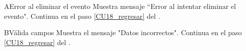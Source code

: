     \begin{UCtrayectoriaA}{A}{Error al eliminar el evento}
    	\UCpaso Muestra mensaje “Error al intentar eliminar el evento".
    	\UCpaso Continua en el paso \ref{CU18_regresar} del .
    \end{UCtrayectoriaA}

	\begin{UCtrayectoriaA}{B}{Válida campos}
		\UCpaso Muestra el mensaje "Datos incorrectos".
   		\UCpaso Continua en el paso \ref{CU18_regresar} del .
	\end{UCtrayectoriaA}

	


